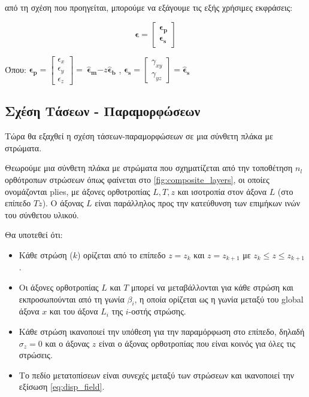 από τη σχέση που προηγείται, μπορούμε να εξάγουμε τις εξής χρήσιμες εκφράσεις:

\begin{equation}
    \boldsymbol{\epsilon} = 
    \begin{bmatrix}
        \boldsymbol{\epsilon}_{\mathbf{p}} \\
        \boldsymbol{\epsilon}_{\mathbf{s}}
    \end{bmatrix}
\end{equation}

Όπου: 
$\boldsymbol{\epsilon}_{\mathbf{p}} = 
\begin{bmatrix}
\epsilon_{x} \\
\epsilon_{y} \\
\epsilon_{z}
\end{bmatrix} = \ {\hat{\boldsymbol{\epsilon}}}_{\mathbf{m}}\mathbf{-}z{\hat{\boldsymbol{\epsilon}}}_{\mathbf{b}}$
,\quad
$\boldsymbol{\epsilon}_{\mathbf{s}}=\begin{bmatrix}
\gamma_{xy} \\
\gamma_{yz}
\end{bmatrix}={\hat{\boldsymbol{\epsilon}}}_{\mathbf{s}}
$

\subsection{Σχέση Τάσεων - Παραμορφώσεων}\label{stress-strain-relationship}


Τώρα θα εξαχθεί η σχέση τάσεων-παραμορφώσεων σε μια σύνθετη πλάκα με στρώματα.

Θεωρούμε μια σύνθετη πλάκα με στρώματα που σχηματίζεται από την τοποθέτηση $n_{l}$ ορθότροπων στρώσεων όπως φαίνεται στο \autoref{fig:composite_layers}, οι οποίες ονομάζονται \textlatin{plies}, με άξονες ορθοτροπίας $L,T,z$ και ισοτροπία στον άξονα $L$ (στο επίπεδο $Tz$). Ο άξονας $L$ είναι παράλληλος προς την κατεύθυνση των επιμήκων ινών του σύνθετου υλικού.

Θα υποτεθεί ότι:

\begin{itemize}
\item
  Κάθε στρώση ($k$) ορίζεται από το επίπεδο $z = z_{k}$ και $z = z_{k + 1}$ με $z_{k} \leq z \leq z_{k + 1}$.
\item
  Οι άξονες ορθοτροπίας $L$ και $T$ μπορεί να μεταβάλλονται για κάθε στρώση και εκπροσωπούνται από τη γωνία $\beta_{i}$, η οποία ορίζεται ως η γωνία μεταξύ του \textlatin{global} άξονα $x$ και του άξονα $L_{i}$ της $i$-οστής στρώσης.
\item
  Κάθε στρώση ικανοποιεί την υπόθεση για την παραμόρφωση στο επίπεδο, δηλαδή $\sigma_{z} = 0$ και ο άξονας $z$ είναι ο άξονας ορθοτροπίας που είναι κοινός για όλες τις στρώσεις.
\item
Το πεδίο μετατοπίσεων είναι συνεχές μεταξύ των στρώσεων και ικανοποιεί την εξίσωση \eqref{eq:disp_field}.
\end{itemize}

